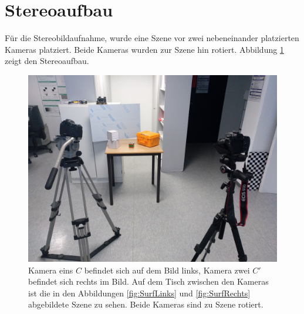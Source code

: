 %
%
%
%
%
%


\section{Stereoaufbau}


Für die Stereobildaufnahme, wurde eine Szene vor zwei nebeneinander platzierten Kameras platziert. Beide Kameras wurden zur Szene hin rotiert. Abbildung \ref{fig:StereoaufbauReal} zeigt den Stereoaufbau.\\





\begin{figure}[!htb]
	\centering
	\includegraphics[width=.7\linewidth]{images/SetUpSameResolution.jpg}
	\caption[Stereoaufbau im Überblick]{Kamera eins $C$ befindet sich auf dem Bild links, Kamera zwei $C'$ befindet sich rechts im Bild. Auf dem Tisch zwischen den Kameras ist die in den Abbildungen \ref{fig:SurfLinks} und \ref{fig:SurfRechts} abgebildete Szene zu sehen. Beide Kameras sind zu Szene rotiert.}
	\label{fig:StereoaufbauReal}
\end{figure}


